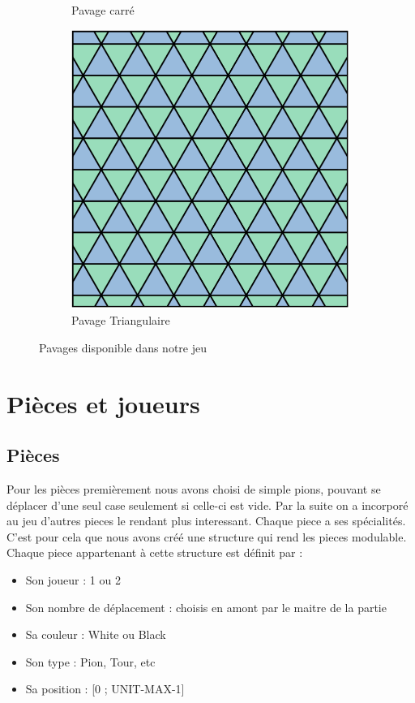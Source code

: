 \documentclass[10pt,a4paper,oneside]{report}
\begin{document}
\begin{figure}[htbp]
\begin{subfigure}{0.3\textwidth}
\caption{Pavage carré}
\label{label_de_l_image_2}
\end{subfigure}
\quad 
\begin{subfigure}{0.3\textwidth}
\centering
\includegraphics[width=\textwidth]{plateautri.png}
\caption{Pavage Triangulaire}
\label{label_de_l_image_3}
\end{subfigure}
\caption{Pavages disponible dans notre jeu}
\label{label_de_la_figure 1}
\end{figure}


\section{Pièces et joueurs}
\subsection{Pièces}
 Pour les pièces premièrement nous avons choisi de simple pions, pouvant se déplacer d'une seul case seulement si celle-ci est vide. Par la suite on a incorporé au jeu d'autres pieces le rendant plus interessant. Chaque piece a ses spécialités.\\ 
        C'est pour cela que nous avons créé une structure qui rend les pieces modulable. Chaque piece appartenant à cette structure est définit par : 
        \begin{itemize}
            \item Son joueur : 1 ou 2 
            \item Son nombre de déplacement : choisis en amont par le maitre de la partie
            \item Sa couleur : White ou Black 
            \item Son type : Pion, Tour, etc
            \item Sa position : [0 ; UNIT-MAX-1]\\
        \end{itemize}
\end{document}
